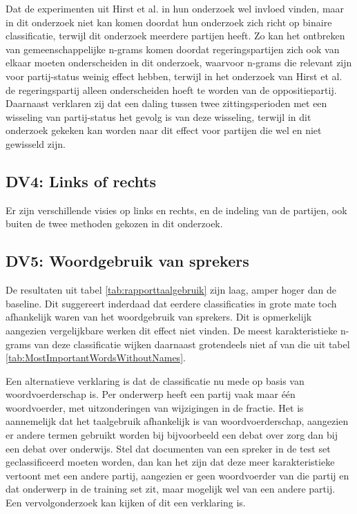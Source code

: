 Dat de experimenten uit Hirst et al. in hun onderzoek wel invloed vinden, maar in dit onderzoek niet kan komen doordat hun onderzoek zich richt op binaire classificatie, terwijl dit onderzoek meerdere partijen heeft. Zo kan het ontbreken van gemeenschappelijke n-grams komen doordat regeringspartijen zich ook van elkaar moeten onderscheiden in dit onderzoek, waarvoor n-grams die relevant zijn voor partij-status weinig effect hebben, terwijl in het onderzoek van Hirst et al. de regeringspartij alleen onderscheiden hoeft te worden van de oppositiepartij. Daarnaast verklaren zij dat een daling tussen twee zittingsperioden met een wisseling van partij-status het gevolg is van deze wisseling, terwijl in dit onderzoek gekeken kan worden naar dit effect voor partijen die wel en niet gewisseld zijn.\par

\subsection{DV4: Links of rechts}
Er zijn verschillende visies op links en rechts, en de indeling van de partijen, ook buiten de twee methoden gekozen in dit onderzoek.\par

\subsection{DV5: Woordgebruik van sprekers}
De resultaten uit tabel \ref{tab:rapporttaalgebruik} zijn laag, amper hoger dan de baseline. Dit suggereert inderdaad dat eerdere classificaties in grote mate toch afhankelijk waren van het woordgebruik van sprekers. Dit is opmerkelijk aangezien vergelijkbare werken dit effect niet vinden. De meest karakteristieke n-grams van deze classificatie wijken daarnaast grotendeels niet af van die uit tabel \ref{tab:MostImportantWordsWithoutNames}.\par
Een alternatieve verklaring is dat de classificatie nu mede op basis van woordvoerderschap is. Per onderwerp heeft een partij vaak maar één woordvoerder, met uitzonderingen van wijzigingen in de fractie. Het is aannemelijk dat het taalgebruik afhankelijk is van woordvoerderschap, aangezien er andere termen gebruikt worden bij bijvoorbeeld een debat over zorg dan bij een debat over onderwijs. Stel dat documenten van een spreker in de test set geclassificeerd moeten worden, dan kan het zijn dat deze meer karakteristieke vertoont met een andere partij, aangezien er geen woordvoerder van die partij en dat onderwerp in de training set zit, maar mogelijk wel van een andere partij. Een vervolgonderzoek kan kijken of dit een verklaring is.\par

